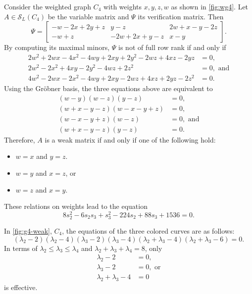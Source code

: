 \documentclass{article}
\theoremstyle{definition}
\newcommand{\mptn}{\mathcal{S}}
\begin{document}
Consider the weighted graph $C_4$ with weights $x,y,z,w$ as shown in \cref{fig:wg4}.  Let $A\in\mptn_L(C_4)$ be the variable matrix and $\Psi$ its verification matrix.  Then
\[
    \Psi = \begin{bmatrix}
        -w - 2x + 2y + z & y - z & 2w + x - y - 2z \\
        -w + z & -2w + 2x + y - z & x - y
    \end{bmatrix}.
\]
By computing its maximal minors, $\Psi$ is not of full row rank if and only if
\[
    \begin{aligned}
        2w^{2} + 2w x - 4x^{2} - 4w y + 2x y + 2y^{2} - 2w z + 4x z - 2y z &= 0, \\
        2w^{2} - 2x^{2} + 4x y - 2y^{2} - 4w z + 2z^{2} &= 0, \text{ and} \\
        4w^{2} - 2w x - 2x^{2} - 4w y + 2x y - 2w z + 4x z + 2y z - 2z^{2} &= 0.
    \end{aligned}
\]
Using the Gr\"obner basis, the three equations above are equivalent to 
\[
    \begin{aligned}
        (w - y)(w - z)(y - z) &= 0, \\
        (w + x - y - z)(w - x - y + z) &= 0, \\
        (w - x - y + z)(w - z) &= 0, \text{ and} \\
        (w + x - y - z)(y - z) &= 0.
    \end{aligned}
\]
Therefore, $A$ is a weak matrix if and only if one of the following hold:
\begin{itemize}
    \item $w = x$ and $y = z$.
    \item $w = y$ and $x = z$, or 
    \item $w = z$ and $x = y$. 
\end{itemize}
These relations on weights lead to the equation  
\[
    8 s_{2}^{2} - 6 s_{2} s_{3} + s_{3}^{2} - 224 s_{2} + 88 s_{3} + 1536 = 0.
\]

In \cref{fig:g4-weak}, $C_4$, the equations of the three colored curves are as follows:
\[
    (\lambda_2 - 2)(\lambda_2 - 4)(\lambda_3 - 2)(\lambda_3 - 4)(\lambda_2 + \lambda_3 - 4)(\lambda_2 + \lambda_3 - 6) = 0.
\]
In terms of $\lambda_2 \leq \lambda_3 \leq \lambda_4$ and $\lambda_2 + \lambda_3 + \lambda_4 = 8$, only 
\begin{align}
    \lambda_2 - 2 &= 0 \label{eq:c4-v}, \\
    \lambda_3 - 2 &= 0, \text{ or} \label{eq:c4-h}\\
    \lambda_2 + \lambda_3 - 4 &= 0 \label{eq:c4-d}
\end{align}
is effective.
\end{document}
